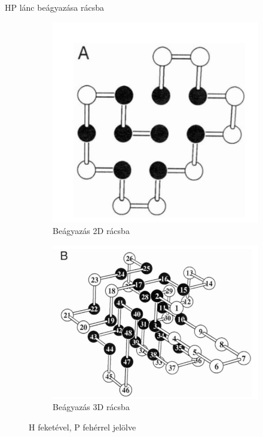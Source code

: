 \documentclass[aspectratio=169]{beamer}
\begin{document}
\begin{frame}{HP lánc beágyazása rácsba}
\begin{figure}[H]
  \centering
  \begin{subfigure}{.4\linewidth}
    \centering
    \includegraphics[width=\linewidth]{./dipterv1_figures/hp_model_2d.png}
    \caption{Beágyazás 2D rácsba}
  \end{subfigure}
  \begin{subfigure}{.55\linewidth}
    \centering
    \includegraphics[width=\linewidth]{./dipterv1_figures/hp_model_3d.png}
    \caption{Beágyazás 3D rácsba}
  \end{subfigure}
  \caption{H feketével, P fehérrel jelölve}
\end{figure}
\end{frame}
\end{document}
